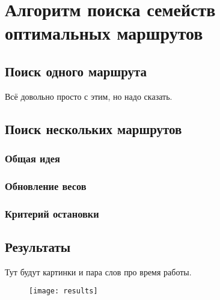 \chapter{Алгоритм поиска семейств оптимальных маршрутов}

\FloatBarrier

\section{Поиск одного маршрута}

Всё довольно просто с этим, но надо сказать.

\FloatBarrier

\section{Поиск нескольких маршрутов}

\subsection{Общая идея}

\subsection{Обновление весов}

\subsection{Критерий остановки}

\section{Результаты}

Тут будут картинки и пара слов про время работы.

\begin{figure}
    \texttt{[image: results]}
\end{figure}

\FloatBarrier

